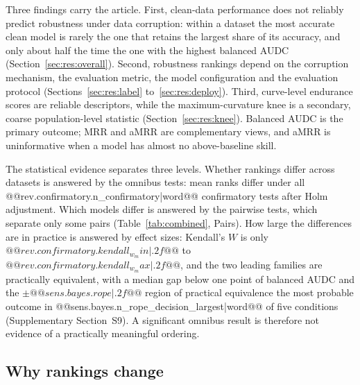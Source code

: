 \documentclass[pdflatex,sn-mathphys]{sn-jnl}
\theoremstyle{thmstyleone}
\theoremstyle{thmstyletwo}
\theoremstyle{thmstylethree}
\begin{document}
Three findings carry the article. First, clean-data performance does not reliably predict robustness under data corruption: within a dataset the most accurate clean model is rarely the one that retains the largest share of its accuracy, and only about half the time the one with the highest balanced AUDC (Section~\ref{sec:res:overall}). Second, robustness rankings depend on the corruption mechanism, the evaluation metric, the model configuration and the evaluation protocol (Sections~\ref{sec:res:label} to~\ref{sec:res:deploy}). Third, curve-level endurance scores are reliable descriptors, while the maximum-curvature knee is a secondary, coarse population-level statistic (Section~\ref{sec:res:knee}). Balanced AUDC is the primary outcome; MRR and aMRR are complementary views, and aMRR is uninformative when a model has almost no above-baseline skill.

The statistical evidence separates three levels. Whether rankings differ across datasets is answered by the omnibus tests: mean ranks differ under all @@{rev.confirmatory.n_confirmatory|word}@@ confirmatory tests after Holm adjustment. Which models differ is answered by the pairwise tests, which separate only some pairs (Table~\ref{tab:combined}, Pairs). How large the differences are in practice is answered by effect sizes: Kendall's $W$ is only $@@{rev.confirmatory.kendall_w_min|.2f}@@$ to $@@{rev.confirmatory.kendall_w_max|.2f}@@$, and the two leading families are practically equivalent, with a median gap below one point of balanced AUDC and the $\pm@@{sens.bayes.rope|.2f}@@$ region of practical equivalence the most probable outcome in @@{sens.bayes.n_rope_decision_largest|word}@@ of five conditions (Supplementary Section~S9). A significant omnibus result is therefore not evidence of a practically meaningful ordering.

\subsection{Why rankings change}\label{sec:disc:why}
\end{document}

